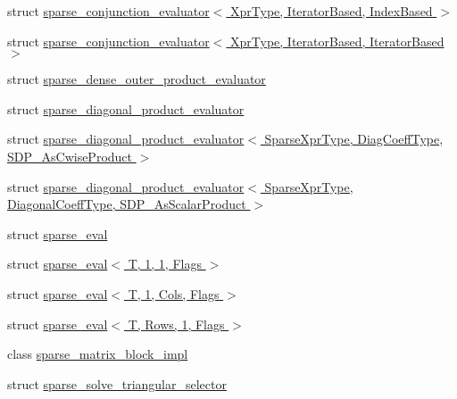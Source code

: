 \begin{DoxyCompactItemize}
struct \hyperlink{struct_eigen_1_1internal_1_1sparse__conjunction__evaluator_3_01_xpr_type_00_01_iterator_based_00_01_index_based_01_4}{sparse\+\_\+conjunction\+\_\+evaluator$<$ Xpr\+Type, Iterator\+Based, Index\+Based $>$}
\item 
struct \hyperlink{struct_eigen_1_1internal_1_1sparse__conjunction__evaluator_3_01_xpr_type_00_01_iterator_based_00_01_iterator_based_01_4}{sparse\+\_\+conjunction\+\_\+evaluator$<$ Xpr\+Type, Iterator\+Based, Iterator\+Based $>$}
\item 
struct \hyperlink{struct_eigen_1_1internal_1_1sparse__dense__outer__product__evaluator}{sparse\+\_\+dense\+\_\+outer\+\_\+product\+\_\+evaluator}
\item 
struct \hyperlink{struct_eigen_1_1internal_1_1sparse__diagonal__product__evaluator}{sparse\+\_\+diagonal\+\_\+product\+\_\+evaluator}
\item 
struct \hyperlink{struct_eigen_1_1internal_1_1sparse__diagonal__product__evaluator_3_01_sparse_xpr_type_00_01_diag5c533b27b8fe485cf13e7ad699b99003}{sparse\+\_\+diagonal\+\_\+product\+\_\+evaluator$<$ Sparse\+Xpr\+Type, Diag\+Coeff\+Type, S\+D\+P\+\_\+\+As\+Cwise\+Product $>$}
\item 
struct \hyperlink{struct_eigen_1_1internal_1_1sparse__diagonal__product__evaluator_3_01_sparse_xpr_type_00_01_diag3ebd66799ce02a814119c716700b9642}{sparse\+\_\+diagonal\+\_\+product\+\_\+evaluator$<$ Sparse\+Xpr\+Type, Diagonal\+Coeff\+Type, S\+D\+P\+\_\+\+As\+Scalar\+Product $>$}
\item 
struct \hyperlink{struct_eigen_1_1internal_1_1sparse__eval}{sparse\+\_\+eval}
\item 
struct \hyperlink{struct_eigen_1_1internal_1_1sparse__eval_3_01_t_00_011_00_011_00_01_flags_01_4}{sparse\+\_\+eval$<$ T, 1, 1, Flags $>$}
\item 
struct \hyperlink{struct_eigen_1_1internal_1_1sparse__eval_3_01_t_00_011_00_01_cols_00_01_flags_01_4}{sparse\+\_\+eval$<$ T, 1, Cols, Flags $>$}
\item 
struct \hyperlink{struct_eigen_1_1internal_1_1sparse__eval_3_01_t_00_01_rows_00_011_00_01_flags_01_4}{sparse\+\_\+eval$<$ T, Rows, 1, Flags $>$}
\item 
class \hyperlink{class_eigen_1_1internal_1_1sparse__matrix__block__impl}{sparse\+\_\+matrix\+\_\+block\+\_\+impl}
\item 
struct \hyperlink{struct_eigen_1_1internal_1_1sparse__solve__triangular__selector}{sparse\+\_\+solve\+\_\+triangular\+\_\+selector}
\item 

\end{DoxyCompactItemize}
